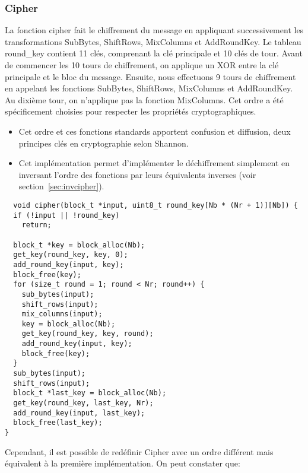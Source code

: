 \documentclass[a4paper, 10pt]{article}
\begin{document}
  \subsubsection{Cipher}
  \label{sec:cipher}
  La fonction cipher fait le chiffrement du message en appliquant successivement les transformations 
  SubBytes, ShiftRows, MixColumns et AddRoundKey.
  Le tableau round_key contient 11 clés, comprenant la clé principale et 10 clés de tour. 
  Avant de commencer les 10 tours de chiffrement, on applique un XOR entre la clé principale et le bloc du message.
  Ensuite, nous effectuons 9 tours de chiffrement en appelant les fonctions SubBytes, ShiftRows, MixColumns et AddRoundKey. 
  Au dixième tour, on n'applique pas la fonction MixColumns.
  Cet ordre a été spécificement choisies pour respecter les propriétés cryptographiques.
  \begin{itemize}
    \item Cet ordre et ces fonctions standards apportent confusion et diffusion, deux principes clés en cryptographie selon Shannon.
    \item Cet implémentation permet d'implémenter le déchiffrement simplement en inversant l'ordre des fonctions 
    par leurs équivalents inverses (voir section~\ref{sec:invcipher}).
  \end{itemize}
  \small{
  \begin{verbatim}
  void cipher(block_t *input, uint8_t round_key[Nb * (Nr + 1)][Nb]) {
  if (!input || !round_key)
    return;

  block_t *key = block_alloc(Nb);
  get_key(round_key, key, 0);
  add_round_key(input, key);
  block_free(key);
  for (size_t round = 1; round < Nr; round++) {
    sub_bytes(input);
    shift_rows(input);
    mix_columns(input);
    key = block_alloc(Nb);
    get_key(round_key, key, round);
    add_round_key(input, key);
    block_free(key);
  }
  sub_bytes(input);
  shift_rows(input);
  block_t *last_key = block_alloc(Nb);
  get_key(round_key, last_key, Nr);
  add_round_key(input, last_key);
  block_free(last_key);
}  
  \end{verbatim}
  }
  Cependant, il est possible de redéfinir Cipher avec un ordre différent mais 
  équivalent à la première implémentation. On peut constater que:
\end{document}
